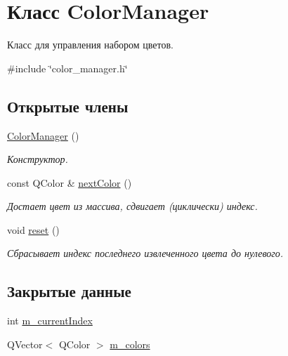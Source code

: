 \hypertarget{class_color_manager}{}\section{Класс Color\+Manager}
\label{class_color_manager}


Класс для управления набором цветов.  




{\ttfamily \#include \char`\"{}color\+\_\+manager.\+h\char`\"{}}

\subsection*{Открытые члены}
\begin{DoxyCompactItemize}
\item 
\hyperlink{class_color_manager_a430efaaefd3650e29bcf4802394c29e9}{Color\+Manager} ()
\begin{DoxyCompactList}\small\item\em Конструктор. \end{DoxyCompactList}\item 
\hypertarget{class_color_manager_ab7ace598efd321831f0924572a4bf84e}{}\label{class_color_manager_ab7ace598efd321831f0924572a4bf84e} 
const Q\+Color \& \hyperlink{class_color_manager_ab7ace598efd321831f0924572a4bf84e}{next\+Color} ()
\begin{DoxyCompactList}\small\item\em Достает цвет из массива, сдвигает (циклически) индекс. \end{DoxyCompactList}\item 
\hypertarget{class_color_manager_ae32d588a9d0144e2d55408c29f2f11ef}{}\label{class_color_manager_ae32d588a9d0144e2d55408c29f2f11ef} 
void \hyperlink{class_color_manager_ae32d588a9d0144e2d55408c29f2f11ef}{reset} ()
\begin{DoxyCompactList}\small\item\em Сбрасывает индекс последнего извлеченного цвета до нулевого. \end{DoxyCompactList}\end{DoxyCompactItemize}
\subsection*{Закрытые данные}
\begin{DoxyCompactItemize}
\item 
int \hyperlink{class_color_manager_a7b6e45b4281881b4cf37a40dafd1a77a}{m\+\_\+current\+Index}
\item 
Q\+Vector$<$ Q\+Color $>$ \hyperlink{class_color_manager_ac91ea962bfa95bc3ed7da0bfd44615f4}{m\+\_\+colors}
\end{DoxyCompactItemize}


